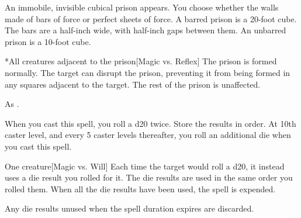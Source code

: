 \begin{spellheader}
    \spellrng{\rngmed}
    \spelldur{\durlong \dismissable}
\end{spellheader}
\begin{spelleffects}
    \spelleffect An immobile, invisible cubical prison appears. You choose whether the walls made of bars of force or perfect sheets of force. A barred prison is a 20-foot cube. The bars are a half-inch wide, with half-inch gaps between them. An unbarred prison is a 10-foot cube.
    \begin{spelltarget}*{All creatures adjacent to the prison}[Magic vs. Reflex]
        \spellsuccess The prison is formed normally.
        \spellfailure The target can disrupt the prison, preventing it from being formed in any squares adjacent to the target. The rest of the prison is unaffected.
    \end{spelltarget}
\end{spelleffects}
\begin{spellfooter}
    \spellnotes As .
\end{spellfooter}

\begin{spellheader}
    \spellrng{\rngmed}
    \spellspecial When you cast this spell, you roll a d20 twice. Store the results in order. At 10th caster level, and every 5 caster levels thereafter, you roll an additional die when you cast this spell.
\end{spellheader}
\begin{spelleffects}
    \begin{spelltarget}{One creature}[Magic vs. Will]
        \spellsuccess Each time the target would roll a d20, it instead uses a die result you rolled for it. The die results are used in the same order you rolled them. When all the die results have been used, the spell is expended.
    \end{spelltarget}
\end{spelleffects}
\begin{spellfooter}
    \spellnotes Any die results unused when the spell duration expires are discarded.
\end{spellfooter}

